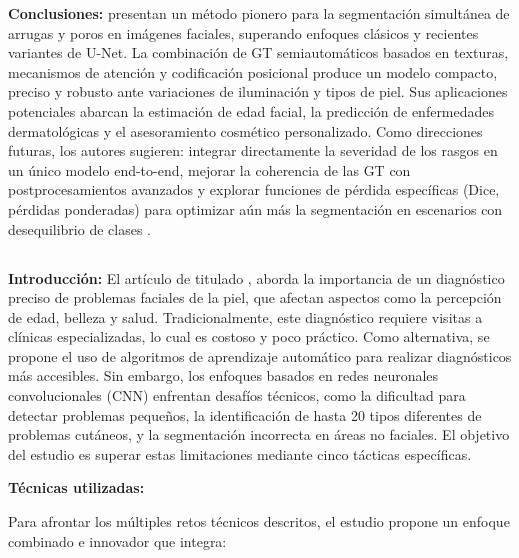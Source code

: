 \textbf{Conclusiones:}
\cite{yoon2023} presentan un método pionero para la segmentación simultánea de arrugas y poros en imágenes faciales, superando enfoques clásicos y recientes variantes de U-Net. La combinación de GT semiautomáticos basados en texturas, mecanismos de atención y codificación posicional produce un modelo compacto, preciso y robusto ante variaciones de iluminación y tipos de piel. Sus aplicaciones potenciales abarcan la estimación de edad facial, la predicción de enfermedades dermatológicas y el asesoramiento cosmético personalizado. Como direcciones futuras, los autores sugieren: integrar directamente la severidad de los rasgos en un único modelo end-to-end, mejorar la coherencia de las GT con postprocesamientos avanzados y explorar funciones de pérdida específicas (Dice, pérdidas ponderadas) para optimizar aún más la segmentación en escenarios con desequilibrio de clases .

\subsection{}

\textbf{Introducción:}
El artículo de \cite{Kim2023} titulado , aborda la importancia de un diagnóstico preciso de problemas faciales de la piel, que afectan aspectos como la percepción de edad, belleza y salud. Tradicionalmente, este diagnóstico requiere visitas a clínicas especializadas, lo cual es costoso y poco práctico. Como alternativa, se propone el uso de algoritmos de aprendizaje automático para realizar diagnósticos más accesibles. Sin embargo, los enfoques basados en redes neuronales convolucionales (CNN) enfrentan desafíos técnicos, como la dificultad para detectar problemas pequeños, la identificación de hasta 20 tipos diferentes de problemas cutáneos, y la segmentación incorrecta en áreas no faciales. El objetivo del estudio es superar estas limitaciones mediante cinco tácticas específicas.

\textbf{Técnicas utilizadas:}

Para afrontar los múltiples retos técnicos descritos, el estudio propone un enfoque combinado e innovador que integra:

